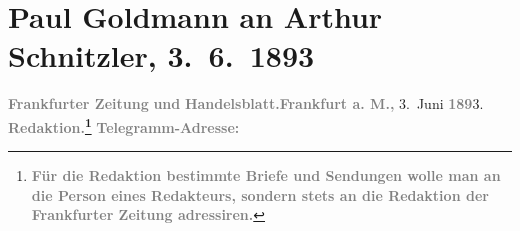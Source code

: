

         
         \newcommand{\erwaehntePersonen}{Personen: Richard Beer-Hofmann, Kurt Eisner, Hugo von Hofmannsthal, Fedor Mamroth, Vally Rosengart, Josef Rosengart, August Stein}
         \newcommand{\erwaehnteInstitutionen}{Institutionen: Frankfurter Zeitung, S. Fischer Verlag}
         \newcommand{\erwaehnteOrte}{Orte: Berlin, Frankfurt am Main, Laupheim, Paris, Wien}
         \newcommand{\erwaehnteWerke}{Werke: Anatol, Das Märchen. Schauspiel in drei Aufzügen, Frankfurter Zeitung, Neue Deutsche Rundschau, Sterben. Novelle}
               \section[Paul Goldmann an Arthur Schnitzler, 3. 6. 1893]{ Paul Goldmann an Arthur Schnitzler, 3. 6. 1893}\nopagebreak{}\rehead{ }\begin{ledgroupsized}[t]{13cm}\normalsize\beginnumbering \toendnotes[C]{\smallbreak\pagebreak[2]} 
\toendnotes[C]{\smallbreak}\pstart
           \noindent{}{\pb}\textcolor{gray}{\textbf{\textbf{Frankfurter Zeitung}}}\pend
           \pstart
           \textcolor{gray}{\textbf{und}}\pend
           \pstart
           \textcolor{gray}{\textbf{\textbf{Handelsblatt}.}}\hfill \textcolor{gray}{\textbf{Frankfurt a.
                        M.,}}{ }3. Juni \textcolor{gray}{\textbf{189}}3.\pend
           \pstart
           \textcolor{gray}{\textbf{\textbf{Redaktion.}\footnote{\noindent{}\textcolor{gray}{\textbf{Für die Redaktion bestimmte Briefe und Sendungen wolle
                              man  an die Person eines Redakteurs,
                              sondern stets \textbf{an die Redaktion der Frankfurter Zeitung} adressiren.}}}}}\pend
           \pstart
           \textcolor{gray}{\textbf{\textbf{Telegramm-Adresse:}}}\pend

\end{ledgroupsized}
